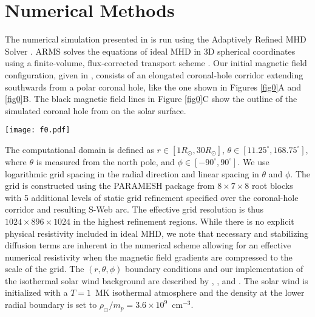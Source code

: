 \documentclass[preprint]{aastex62}
\begin{document}
\section{Numerical Methods}
\label{sxn_setup}


The numerical simulation presented in 
is run using the Adaptively Refined MHD Solver \citep[ARMS;][]{DeVore2008}.
ARMS solves the equations of ideal MHD in 3D spherical coordinates
using a finite-volume, flux-corrected transport scheme \citep{DeVore1991}.
Our initial magnetic field configuration, given in \citet{Antiochos2011},
consists of an elongated coronal-hole corridor extending southwards
from a polar coronal hole, like the one shown in Figures \ref{fig0}A and \ref{fig0}B. 
The black magnetic field lines in Figure \ref{fig0}C show the outline of the simulated coronal hole from  
on the solar surface. 


\begin{figure*}
	\texttt{[image: f0.pdf]}
	\caption{A. \textit{Solar Dynamics Observatory} EUV image of the Sun. 
	The coronal hole appears dark relative to the surrounding corona. B. 
	Zoom-in of white box from A. C. Simulated S-Web corridor. Black 
	magnetic field lines outline the boundary of the polar and low-latitude
	open regions and the connecting open-field corridor on the surface. 
	Cyan dots cross the corridor. Yellow/green/purple shading indicates
	the driving velocity magnitude applied in the simulations; white velocity
	streamlines on the surface show the rotational motion. (Reproduced from .)}
	\label{fig0}
\end{figure*}



The computational domain is defined as $r \in [1R_\odot, 30R_\odot]$,
$\theta \in [11.25^\circ,168.75^\circ]$, where $\theta$ is measured
from the north pole, and $\phi \in [-90^\circ,90^\circ]$. We use
logarithmic grid spacing in the radial direction and linear spacing
in $\theta$ and $\phi$. The grid is constructed using the PARAMESH
package \citep{MacNeice2000} from $8 \times 7 \times 8$ root blocks
with 5 additional levels of static grid refinement specified over
the coronal-hole corridor and resulting S-Web arc. The effective
grid resolution is thus $1024 \times 896 \times 1024$ in the highest
refinement regions.
%
While there is no explicit physical resistivity included in ideal
MHD, we note that necessary and stabilizing diffusion terms are
inherent in the numerical scheme allowing for an effective numerical
resistivity when the magnetic field gradients are compressed
to the scale of the grid.
%
The $(r, \theta, \phi)$ boundary conditions and our implementation
of the \citet{Parker1958} isothermal solar wind background are
described by \citet{Masson2013}, \citet{Karpen2017}, and
\citet{Higginson2017a}. The solar wind is initialized with a $T=1$~MK
isothermal atmosphere and the density at the lower radial boundary
is set to $\rho_\odot/m_p = 3.6 \times 10^9$~cm$^{-3}$.
\end{document}
